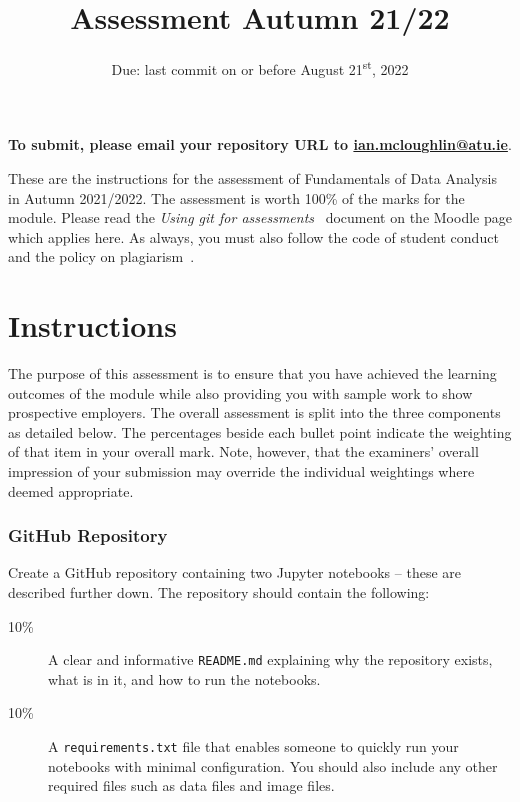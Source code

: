 \documentclass[a4paper, 12pt]{scrartcl}
\title{Assessment Autumn 21/22}
\author{}
\date{Due: last commit on or before August 21\textsuperscript{st}, 2022}
\begin{document}
  
  \maketitle
  
  \vspace{-12mm}
  \begin{center} \textbf{To submit, please email your repository URL to \url{ian.mcloughlin@atu.ie}}. \end{center}


  \noindent These are the instructions for the assessment of Fundamentals of Data Analysis in Autumn 2021/2022.
  The assessment is worth 100\% of the marks for the module.
  Please read the \emph{Using git for assessments}~\cite{usinggit} document on the Moodle page which applies here.
  As always, you must also follow the code of student conduct and the policy on plagiarism~\cite{gmitqaf}.

  \section*{Instructions}
  
  The purpose of this assessment is to ensure that you have achieved the learning outcomes of the module while also providing you with sample work to show prospective employers.
  The overall assessment is split into the three components as detailed below.
  The percentages beside each bullet point indicate the weighting of that item in your overall mark.
  Note, however, that the examiners' overall impression of your submission may override the individual weightings where deemed appropriate.

  \subsubsection*{GitHub Repository}
  Create a GitHub repository containing two Jupyter notebooks -- these are described further down.
  The repository should contain the following:
  \begin{description}
    \item[10\%] A clear and informative \texttt{README.md} explaining why the repository exists, what is in it, and how to run the notebooks.
    \item[10\%] A \texttt{requirements.txt} file that enables someone to quickly run your notebooks with minimal configuration. You should also include any other required files such as data files and image files.
  \end{description}
\end{document}
